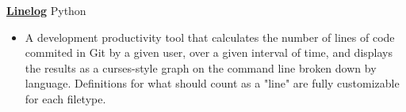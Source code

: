 \documentclass[11pt]{article}
\newcommand{\project}[2]{
    \begingroup
        \textbf{\small#1}
        \hfill\color{black!70}\small{#2}
    \endgroup
}
\newcommand{\spacevv}{
    \vspace{2mm}
}
\begin{document}
\begin{paracol}{2}
{        %
        \project{\href{https://github.com/keagud/linelog}{Linelog}}{Python}
        \begin{itemize}
          \item A development productivity tool that calculates the number of lines of code commited in Git by a given user, over a given interval of time, and displays the results as a curses-style graph on the command line broken down by language. Definitions for what should count as a "line" are fully customizable for each filetype.
        \end{itemize}
        \spacevv

      \iffalse
        \project{\href{https://github.com/keagud/verba}{Verba Whitakari}}{C++, Python, CMake}
        \begin{itemize}
          \item A complete port of the classic Latin morphological analysis and dictionary tool \href{https://en.wikipedia.org/wiki/William\_Whitaker\%27s\_Words>}{William Whitaker's Words}, translated and refactored from the original 1993 Ada program into modern C++. This project aims to maintain the functionality of the original in a form that can be better preserved into the future (Ada build systems are not trivial to work with in \$CURRENT\_YEAR) while improving performance and ease of use. 
        \end{itemize}    
        \fi
}
    \end{paracol}
\end{document}

